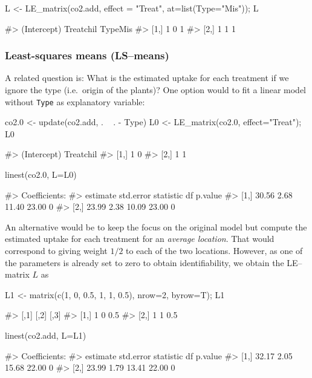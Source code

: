 \begin{Schunk}
\begin{Sinput}
L <- LE_matrix(co2.add, effect = "Treat", at=list(Type="Mis")); L
\end{Sinput}
\begin{Soutput}
#>      (Intercept) Treatchil TypeMis
#> [1,]           1         0       1
#> [2,]           1         1       1
\end{Soutput}
\end{Schunk}

\hypertarget{least-squares-means-lsmeans}{%
\subsubsection{Least-squares means
(LS--means)}\label{least-squares-means-lsmeans}}

A related question is: What is the estimated uptake for each treatment
if we ignore the type (i.e.~origin of the plants)? One option would to
fit a linear model without \texttt{Type} as explanatory variable:

\begin{Schunk}
\begin{Sinput}
co2.0 <- update(co2.add, . ~ . - Type)
L0 <- LE_matrix(co2.0, effect="Treat"); L0
\end{Sinput}
\begin{Soutput}
#>      (Intercept) Treatchil
#> [1,]           1         0
#> [2,]           1         1
\end{Soutput}
\begin{Sinput}
linest(co2.0, L=L0)
\end{Sinput}
\begin{Soutput}
#> Coefficients:
#>      estimate std.error statistic    df p.value
#> [1,]    30.56      2.68     11.40 23.00       0
#> [2,]    23.99      2.38     10.09 23.00       0
\end{Soutput}
\end{Schunk}

An alternative would be to keep the focus on the original model but
compute the estimated uptake for each treatment for an \emph{average
location}. That would correspond to giving weight \(1/2\) to each of the
two locations. However, as one of the parameters is already set to zero
to obtain identifiability, we obtain the LE--matrix \(L\) as

\begin{Schunk}
\begin{Sinput}
L1 <- matrix(c(1, 0, 0.5, 
               1, 1, 0.5), nrow=2, byrow=T); L1
\end{Sinput}
\begin{Soutput}
#>      [,1] [,2] [,3]
#> [1,]    1    0  0.5
#> [2,]    1    1  0.5
\end{Soutput}
\begin{Sinput}
linest(co2.add, L=L1)
\end{Sinput}
\begin{Soutput}
#> Coefficients:
#>      estimate std.error statistic    df p.value
#> [1,]    32.17      2.05     15.68 22.00       0
#> [2,]    23.99      1.79     13.41 22.00       0
\end{Soutput}
\end{Schunk}

